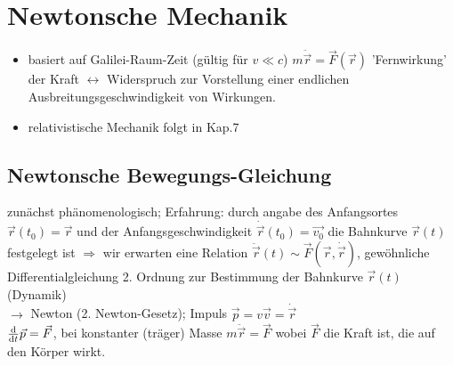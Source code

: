\section{Newtonsche Mechanik}
\begin{itemize}
\item basiert auf Galilei-Raum-Zeit (gültig für $v\ll c$) $m\ddot{\vec{r}}=\vec{F}(\vec{r})$ 'Fernwirkung' der Kraft $\leftrightarrow$ Widerspruch zur Vorstellung einer endlichen Ausbreitungsgeschwindigkeit von Wirkungen.
\item relativistische Mechanik folgt in Kap.7
\end{itemize}
\subsection{Newtonsche Bewegungs-Gleichung}
zunächst phänomenologisch; Erfahrung: durch angabe des Anfangsortes $\vec{r}(t_0)=\vec{r}$ und der Anfangsgeschwindigkeit $\dot{\vec{r}}(t_0)=\vec{v_0}$ die Bahnkurve $\vec{r}(t)$ festgelegt ist $\Rightarrow$ wir erwarten eine Relation $\ddot{\vec{r}}(t) \sim \vec{F}(\vec{r},\dot{\vec{r}})$, gewöhnliche Differentialgleichung 2. Ordnung zur Bestimmung der Bahnkurve $\vec{r}(t)$ (Dynamik)\\
$\rightarrow$ Newton (2. Newton-Gesetz); Impuls $\vec{p}=v\vec{v}=\dot{\vec{r}}$\\
$\frac{\text{d} }{\text{d} t}\vec{p}=\vec{F}$, bei konstanter (träger) Masse $m\ddot{\vec{r}}=\vec{F}$ wobei $\vec{F}$ die Kraft ist, die auf den Körper wirkt.\\

